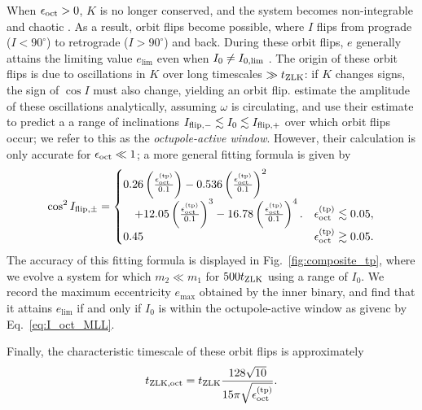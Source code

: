 \documentclass[
        fleqn,
        usenatbib,
    ]{mnras}
\newcommand*{\p}[1]{\left(#1\right)}
\begin{document}
When $\epsilon_{\rm oct} > 0$, $K$ is no longer conserved, and the system
becomes non-integrable and chaotic \citep{ford2000secular, katz2011long,
lithwick2011eccentric}. As a result, orbit flips become possible, where $I$
flips from prograde ($I < 90^\circ$) to retrograde ($I > 90^\circ$) and back.
During these orbit flips, $e$ generally attains the limiting value $e_{\lim}$
even when $I_{\rm 0} \neq I_{\rm 0, \lim}$ \citep{lithwick2011eccentric, LML15}.
The origin of these orbit flips is due to oscillations in $K$ over long
timescales $\gg t_{\rm ZLK}$: if $K$ changes signs, the sign of $\cos I$ must
also change, yielding an orbit flip. \citet{katz2011long} estimate the amplitude
of these oscillations analytically, assuming $\omega$ is circulating, and use
their estimate to predict a a range of inclinations $I_{\rm flip, -} \lesssim
I_0 \lesssim I_{\rm flip, +}$ over which orbit flips occur; we refer to this as
the \emph{octupole-active window}. However, their calculation is only accurate
for $\epsilon_{\rm oct} \ll 1$; a more general fitting formula is given by
\citep{MLL16}
\begin{equation}
    \cos^2 I_{\rm flip, \pm} = \begin{cases}
        0.26\p{\frac{\epsilon_{\rm oct}^{\rm(tp)}}{0.1}}
            - 0.536\p{\frac{\epsilon_{\rm oct}^{\rm(tp)}}{0.1}}^2\\
            \quad + 12.05\p{\frac{\epsilon_{\rm oct}^{\rm(tp)}}{0.1}}^3
            - 16.78\p{\frac{\epsilon_{\rm oct}^{\rm(tp)}}{0.1}}^4.
            & \epsilon_{\rm oct}^{\rm(tp)} \lesssim 0.05,\\
        0.45 & \epsilon_{\rm oct}^{\rm(tp)} \gtrsim 0.05.
    \end{cases} \label{eq:I_oct_MLL}
\end{equation}
The accuracy of this fitting formula is displayed in
Fig.~\ref{fig:composite_tp}, where we evolve a system for which $m_2 \ll m_1$
for $500t_{\rm ZLK}$ using a range of $I_0$. We record the maximum eccentricity
$e_{\max}$ obtained by the inner binary, and find that it attains $e_{\lim}$ if
and only if $I_0$ is within the octupole-active window as givenc by
Eq.~\eqref{eq:I_oct_MLL}.

Finally, the characteristic timescale of these orbit flips is approximately
\citep{antognini2015timescales}
\begin{equation}
    t_{\rm ZLK, oct} = t_{\rm ZLK}\frac{128\sqrt{10}}{
        15\pi\sqrt{\epsilon_{\rm oct}^{\rm(tp)}}}.\label{eq:def_tzlkoct}
\end{equation}
\end{document}
